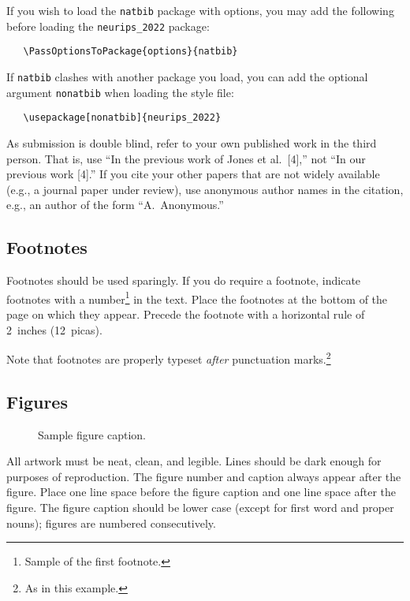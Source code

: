 \documentclass{article}
\begin{document}
If you wish to load the \verb+natbib+ package with options, you may add the
following before loading the \verb+neurips_2022+ package:
\begin{verbatim}
   \PassOptionsToPackage{options}{natbib}
\end{verbatim}

If \verb+natbib+ clashes with another package you load, you can add the
optional argument \verb+nonatbib+ when loading the style file:
\begin{verbatim}
   \usepackage[nonatbib]{neurips_2022}
\end{verbatim}

As submission is double blind, refer to your own published work in the third
person. That is, use ``In the previous work of Jones et al.\ [4],'' not ``In
our previous work [4].'' If you cite your other papers that are not widely
available (e.g., a journal paper under review), use anonymous author names in
the citation, e.g., an author of the form ``A.\ Anonymous.''

\subsection{Footnotes}

Footnotes should be used sparingly. If you do require a footnote, indicate
footnotes with a number\footnote{Sample of the first footnote.} in the text.
Place the footnotes at the bottom of the page on which they appear. Precede the
footnote with a horizontal rule of 2~inches (12~picas).

Note that footnotes are properly typeset \emph{after} punctuation
marks.\footnote{As in this example.}

\subsection{Figures}

\begin{figure}
      \centering
      \fbox{\rule[-.5cm]{0cm}{4cm} \rule[-.5cm]{4cm}{0cm}}
      \caption{Sample figure caption.}
\end{figure}

All artwork must be neat, clean, and legible. Lines should be dark enough for
purposes of reproduction. The figure number and caption always appear after the
figure. Place one line space before the figure caption and one line space after
the figure. The figure caption should be lower case (except for first word and
proper nouns); figures are numbered consecutively.
\end{document}
